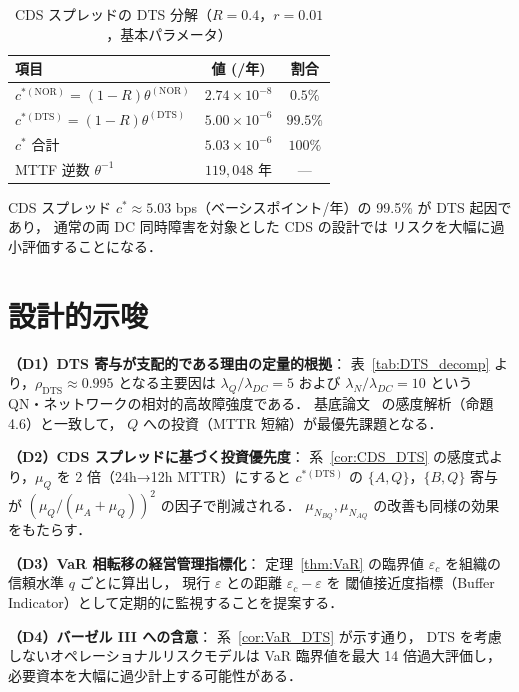 \documentclass[12pt,a4paper]{article}
\theoremstyle{plain}
\theoremstyle{definition}
\theoremstyle{remark}
\newcommand{\eps}{\varepsilon}         %
\newcommand{\thetaNOR}{\theta^{(\mathrm{NOR})}}
\newcommand{\thetaDTS}{\theta^{(\mathrm{DTS})}}
\newcommand{\rhoDTS}{\rho_{\mathrm{DTS}}}
\begin{document}
\begin{table}[H]
  \centering
  \caption{CDS スプレッドの DTS 分解（$R=0.4$，$r=0.01$，基本パラメータ）}
  \label{tab:CDS}
  \begin{tabular}{lcc}
    \toprule
    項目 & 値 (/年) & 割合 \\
    \midrule
    $c^{*(\mathrm{NOR})} = (1-R)\thetaNOR$ & $2.74\times10^{-8}$ & $0.5\%$ \\
    $c^{*(\mathrm{DTS})} = (1-R)\thetaDTS$ & $5.00\times10^{-6}$ & $99.5\%$ \\
    $c^*$ 合計 & $5.03\times10^{-6}$ & $100\%$ \\
    \midrule
    MTTF 逆数 $\theta^{-1}$ & $119{,}048$ 年 & --- \\
    \bottomrule
  \end{tabular}
\end{table}

CDS スプレッド $c^* \approx 5.03$ bps（ベーシスポイント/年）の
99.5\% が DTS 起因であり，
通常の両 DC 同時障害を対象とした CDS の設計では
リスクを大幅に過小評価することになる．

\section{設計的示唆}\label{sec:design}

\textbf{（D1）DTS 寄与が支配的である理由の定量的根拠}：
表~\ref{tab:DTS_decomp} より，$\rhoDTS \approx 0.995$ となる主要因は
$\lambda_Q/\lambda_{DC} = 5$ および $\lambda_{N}/\lambda_{DC} = 10$ という
QN・ネットワークの相対的高故障強度である．
基底論文~\cite{habase:v7} の感度解析（命題 4.6）と一致して，
$Q$ への投資（MTTR 短縮）が最優先課題となる．

\textbf{（D2）CDS スプレッドに基づく投資優先度}：
系~\ref{cor:CDS_DTS} の感度式より，$\mu_Q$ を 2 倍（24h→12h MTTR）にすると
$c^{*(\mathrm{DTS})}$ の $\{A,Q\}$，$\{B,Q\}$ 寄与が $(\mu_Q/(\mu_A+\mu_Q))^2$ の因子で削減される．
$\mu_{N_{BQ}},\mu_{N_{AQ}}$ の改善も同様の効果をもたらす．

\textbf{（D3）VaR 相転移の経営管理指標化}：
定理~\ref{thm:VaR} の臨界値 $\eps_c$ を組織の信頼水準 $q$ ごとに算出し，
現行 $\eps$ との距離 $\eps_c - \eps$ を
閾値接近度指標（Buffer Indicator）として定期的に監視することを提案する．

\textbf{（D4）バーゼル III への含意}：
系~\ref{cor:VaR_DTS} が示す通り，
DTS を考慮しないオペレーショナルリスクモデルは
VaR 臨界値を最大 14 倍過大評価し，
必要資本を大幅に過少計上する可能性がある．
\end{document}
